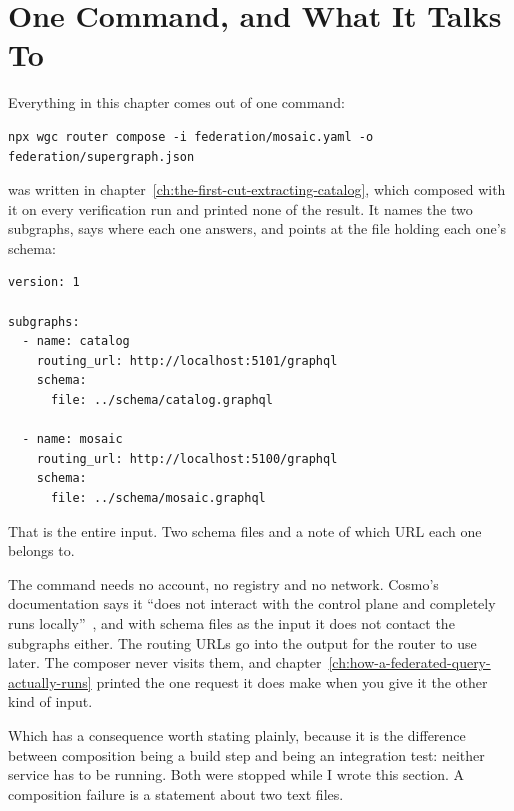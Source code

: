 \section{One Command, and What It Talks To}
\label{sec:ch09-one-command}
%

Everything in this chapter comes out of one command:

\begin{verbatim}
npx wgc router compose -i federation/mosaic.yaml -o federation/supergraph.json
\end{verbatim}

%
 was written in
chapter~\ref{ch:the-first-cut-extracting-catalog}, which composed with it on
every verification run and printed none of the result. It names the two
subgraphs, says where each one answers, and points at the file holding each
one's schema:

\begin{verbatim}
version: 1

subgraphs:
  - name: catalog
    routing_url: http://localhost:5101/graphql
    schema:
      file: ../schema/catalog.graphql

  - name: mosaic
    routing_url: http://localhost:5100/graphql
    schema:
      file: ../schema/mosaic.graphql
\end{verbatim}

That is the entire input. Two schema files and a note of which URL each one
belongs to.

%
The command needs no account, no registry and no network. Cosmo's documentation
says it \enquote{does not interact with the control plane and completely runs
locally}~\autocite{cosmo2026routercompose}, and with schema files as the input
it does not contact the subgraphs either. The routing URLs go into the output
for the router to use later. The composer never visits them, and
chapter~\ref{ch:how-a-federated-query-actually-runs} printed the one request it
does make when you give it the other kind of input.

%
Which has a consequence worth stating plainly, because it is the difference
between composition being a build step and being an integration test: neither
service has to be running. Both were stopped while I wrote this section. A
composition failure is a statement about two text files.

